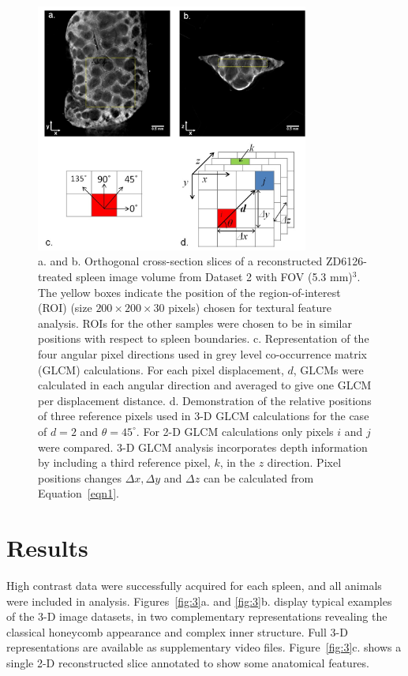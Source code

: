 \documentclass[12pt]{article}
\begin{document}
\begin{figure}%
	\centering
	\includegraphics[width=0.8\textwidth]{Figure2.jpg}
	\caption{a. and b. Orthogonal cross-section slices of a reconstructed ZD6126-treated spleen image volume from Dataset 2 with FOV (5.3 mm)$^3$. The yellow boxes indicate the position of the region-of-interest (ROI) (size $200 \times 200 \times 30$ pixels) chosen for textural feature analysis. ROIs for the other samples were chosen to be in similar positions with respect to spleen boundaries. c. Representation of the four angular pixel directions used in grey level co-occurrence matrix (GLCM) calculations. For each pixel displacement, $d$, GLCMs were calculated in each angular direction and averaged to give one GLCM per displacement distance. d. Demonstration of the relative positions of three reference pixels used in 3-D GLCM calculations for the case of $d = 2$ and $\theta=45^{\circ}$. For 2-D GLCM calculations only pixels $i$ and $j$ were compared. 3-D GLCM analysis incorporates depth information by including a third reference pixel, $k$, in the $z$ direction. Pixel positions changes  $\Delta x, \Delta y$  and $\Delta z$  can be calculated from Equation~\ref{eqn1}.}
	\label{fig:2}
\end{figure}





\section{Results}
High contrast data were successfully acquired for each spleen, and all animals were included in analysis. Figures~\ref{fig:3}a. and \ref{fig:3}b. display typical examples of the 3-D image datasets, in two complementary representations revealing the classical honeycomb appearance and complex inner structure. Full 3-D representations are available as supplementary video files. Figure~\ref{fig:3}c. shows a single 2-D reconstructed slice annotated to show some anatomical features. 
\end{document}
